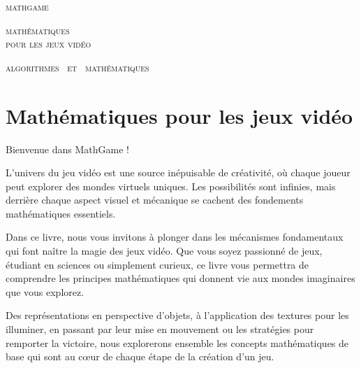 
\pagestyle{empty}\thispagestyle{empty}
\vspace*{\fill}
\vspace*{5ex}
\begin{center}
	\fontsize{40}{40}\selectfont
	\textsc{mathgame}
	
	\vspace*{1ex}
	\textsc{\fontsize{24}{24}\selectfont 
	mathématiques  \\[-1.5ex]
	pour les jeux vidéo
	}
	
	\vspace*{2ex}
	
	\Large

\end{center}
\vfill
\begin{center}
	\Large
	\textsc{algorithmes \  et \  mathématiques}
\end{center}
\begin{center}
\end{center}

\clearpage

\thispagestyle{empty}


\vspace*{\fill}
\section*{Mathématiques pour les jeux vidéo}



Bienvenue dans \og{}MathGame\fg{} !

\medskip

L'univers du jeu vidéo est une source inépuisable de créativité, où chaque joueur peut explorer des mondes virtuels uniques. Les possibilités sont infinies, mais derrière chaque aspect visuel et mécanique se cachent des fondements mathématiques essentiels.

\medskip

Dans ce livre, nous vous invitons à plonger dans les mécanismes fondamentaux qui font naître la magie des jeux vidéo. Que vous soyez passionné de jeux, étudiant en sciences ou simplement curieux, ce livre vous permettra de comprendre les principes mathématiques qui donnent vie aux mondes imaginaires que vous explorez.

\medskip

Des représentations en perspective d'objets, à l'application des textures pour les illuminer, en passant par leur mise en mouvement ou les stratégies pour remporter la victoire, nous explorerons ensemble les concepts mathématiques de base qui sont au cœur de chaque étape de la création d'un jeu.

